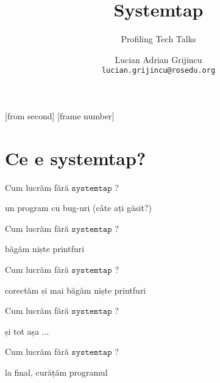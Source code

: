\documentclass{beamer}
\title[Systemtap]{Systemtap}
\subtitle{Profiling Tech Talks}
\institute{ROSEdu}
\author{Lucian Adrian Grijincu \\ \texttt{lucian.grijincu@rosedu.org}}
\newcommand{\systemtap}{$\texttt{systemtap}$ }
\begin{document}
[from second]
[frame number]

\frame{\titlepage}

\frame{\tableofcontents}

\section{Ce e systemtap?}

\frame{\tableofcontents[currentsection]}


\begin{frame}{Cum lucrăm fără \systemtap?}
  \begin{beamerboxesrounded}[lower=block body,shadow=true]{un program cu bug-uri (câte ați găsit?)}
    \small 
  \end{beamerboxesrounded}
\end{frame}


\begin{frame}{Cum lucrăm fără \systemtap?}
  \begin{beamerboxesrounded}[lower=block body,shadow=true]{băgăm niște printfuri}
    \small 
  \end{beamerboxesrounded}
\end{frame}

\begin{frame}{Cum lucrăm fără \systemtap?}
  \begin{beamerboxesrounded}[lower=block body,shadow=true]{corectăm și mai băgăm niște printfuri}
    \small 
  \end{beamerboxesrounded}
\end{frame}

\begin{frame}{Cum lucrăm fără \systemtap?}
  \begin{beamerboxesrounded}[lower=block body,shadow=true]{și tot așa ...}
    \small 
  \end{beamerboxesrounded}
\end{frame}

\begin{frame}{Cum lucrăm fără \systemtap?}
  \begin{beamerboxesrounded}[lower=block body,shadow=true]{la final, curățăm programul}
    \small 
  \end{beamerboxesrounded}
\end{frame}
\end{document}
